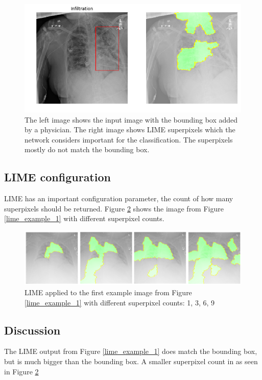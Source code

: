 \begin{figure}[H]
\centering
\includegraphics[width=12cm]{chapters/03_classification/images/lime_8.png}
\caption{The left image shows the input image with the bounding box added by a physician. The right image shows LIME superpixels which the network considers important for the classification. The superpixels mostly do not match the bounding box.}
\label{lime_example_3}
\end{figure}

\subsection{LIME configuration}
LIME has an important configuration parameter, the count of how many superpixels should be returned. Figure \ref{lime_superpixel_count} shows the image from Figure \ref{lime_example_1} with different superpixel counts.

\begin{figure}[H]
\centering
\includegraphics[width=14cm]{chapters/03_classification/images/lime-superpixel.png}
\caption{LIME applied to the first example image from Figure \ref{lime_example_1} with different superpixel counts: 1, 3, 6, 9}
\label{lime_superpixel_count}
\end{figure}

\subsection{Discussion}
The LIME output from Figure \ref{lime_example_1} does match the bounding box, but is much bigger than the bounding box. A smaller superpixel count in as seen in Figure \ref{lime_superpixel_count} 
